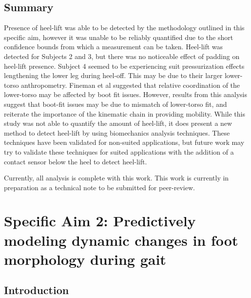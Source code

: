 \documentclass[defaultstyle,11pt]{comps}
\begin{document}
\hypertarget{summary-2}{%
\section{Summary}\label{summary-2}}

Presence of heel-lift was able to be detected by the methodology outlined in this specific aim, however it was unable to be reliably quantified due to the short confidence bounds from which a measurement can be taken.
Heel-lift was detected for Subjects 2 and 3, but there was no noticeable effect of padding on heel-lift presence.
Subject 4 seemed to be experiencing suit pressurization effects lengthening the lower leg during heel-off.
This may be due to their larger lower-torso anthropometry.
Fineman et al \citep{Fineman2018} suggested that relative coordination of the lower-torso may be affected by boot fit issues.
However, results from this analysis suggest that boot-fit issues may be due to mismatch of lower-torso fit, and reiterate the importance of the kinematic chain in providing mobility.
While this study was not able to quantify the amount of heel-lift, it does present a new method to detect heel-lift by using biomechanics analysis techniques.
These techniques have been validated for non-suited applications, but future work may try to validate these techniques for suited applications with the addition of a contact sensor below the heel to detect heel-lift.

Currently, all analysis is complete with this work.
This work is currently in preparation as a technical note to be submitted for peer-review.

\hypertarget{specific-aim-2-predictively-modeling-dynamic-changes-in-foot-morphology-during-gait}{%
\chapter{Specific Aim 2: Predictively modeling dynamic changes in foot morphology during gait}\label{specific-aim-2-predictively-modeling-dynamic-changes-in-foot-morphology-during-gait}}

\hypertarget{introduction-1}{%
\section{Introduction}\label{introduction-1}}
\end{document}

